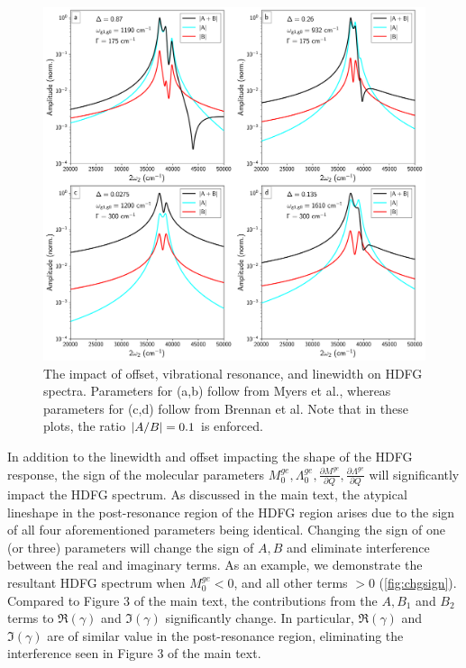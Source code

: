 \documentclass[aip, jcp, reprint, onecolumn, nofootinbib]{revtex4-2}
\begin{document}
\begin{figure}[!htbp]
	\centering
	\includegraphics[width=6.675in]{figures/changedelta.png}
	\caption{The impact of offset, vibrational resonance, and linewidth on HDFG spectra. Parameters for (a,b) follow from Myers et al., whereas parameters for (c,d) follow from Brennan et al.\cite{Myers1982, Brennan2024}
	Note that in these plots, the ratio $\abs{A/B} = 0.1$ is enforced.} 
	\label{fig:chgdelta}
\end{figure}

In addition to the linewidth and offset impacting the shape of the HDFG response, the sign of the molecular parameters $M^{ge}_0, \Lambda^{ge}_0, \frac{\partial M^{ge}}{\partial Q} , \frac{\partial \Lambda^{ge}}{\partial Q}$ will significantly impact the HDFG spectrum.
As discussed in the main text, the atypical lineshape in the post-resonance region of the HDFG region arises due to the sign of all four aforementioned parameters being identical.
Changing the sign of one (or three) parameters will change the sign of $A, B$ and eliminate interference between the real and imaginary terms.  
As an example, we demonstrate the resultant HDFG spectrum when $M_0^{ge} < 0$, and all other terms $>0$ (\autoref{fig:chgsign}).
Compared to Figure 3 of the main text, the contributions from the $A, B_1$ and $B_2$ terms to $\Re(\gamma)$ and $\Im(\gamma)$ significantly change.
In particular, $\Re(\gamma)$ and $\Im(\gamma)$ are of similar value in the post-resonance region, eliminating the interference seen in Figure 3 of the main text.
\end{document}
